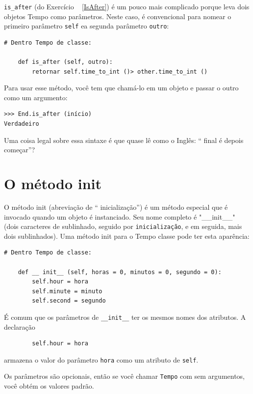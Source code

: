 \documentclass[10pt]{book}
\begin{document}
\begin{v erbatim}
{\Verb "is_after" (do Exercício ~ \ref {IsAfter}) é um pouco mais complicado
porque leva dois objetos Tempo como parâmetros. Neste caso, é
convencional para nomear o primeiro parâmetro {\tt self} ea segunda
parâmetro {\tt outro}:

\begin{verbatim}
# Dentro Tempo de classe:

    def is_after (self, outro):
        retornar self.time_to_int ()> other.time_to_int ()
\end{verbatim}
%
Para usar esse método, você tem que chamá-lo em um objeto e passar
o outro como um argumento:

\begin{verbatim}
>>> End.is_after (início)
Verdadeiro
\end{verbatim}
%
Uma coisa legal sobre essa sintaxe é que quase lê
como o Inglês: `` final é depois começar''?


\section{O método init}

O método init (abreviação de `` inicialização'') é
um método especial que é invocado quando um objeto é instanciado.  
Seu nome completo é \verbo "__init__" (dois caracteres de sublinhado,
seguido por {\tt inicialização}, e em seguida, mais dois sublinhados). Uma
método init para o {\tt} Tempo classe pode ter esta aparência:

\begin{verbatim}
# Dentro Tempo de classe:

    def __ init__ (self, horas = 0, minutos = 0, segundo = 0):
        self.hour = hora
        self.minute = minuto
        self.second = segundo
\end{verbatim}
%
É comum que os parâmetros de \verb "__init__"
ter os mesmos nomes dos atributos. A declaração

\begin{verbatim}
        self.hour = hora
\end{verbatim}
%
armazena o valor do parâmetro {\tt hora} como um atributo
de {\tt self}.

Os parâmetros são opcionais, então se você chamar {\tt Tempo} com
sem argumentos, você obtém os valores padrão.

}
\end{v erbatim}
\end{document}
